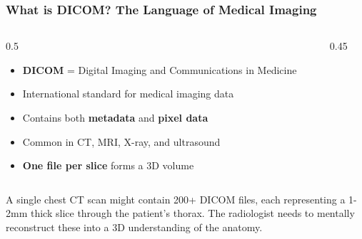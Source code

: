 \begin{frame}
\frametitle{What is DICOM? The Language of Medical Imaging}

\begin{columns}[T]
\begin{column}{0.5\textwidth}
  \begin{itemize}
    \item \textbf{DICOM} = Digital Imaging and Communications in Medicine
    \item International standard for medical imaging data
    \item Contains both \textbf{metadata} and \textbf{pixel data}
    \item Common in CT, MRI, X-ray, and ultrasound
    \item \textbf{One file per slice} forms a 3D volume
  \end{itemize}
\end{column}
\begin{column}{0.45\textwidth}
  \begin{center}
  \end{center}
\end{column}
\end{columns}

A single chest CT scan might contain 200+ DICOM files, each representing a 1-2mm thick slice through the patient's thorax. The radiologist needs to mentally reconstruct these into a 3D understanding of the anatomy.
\end{frame}

